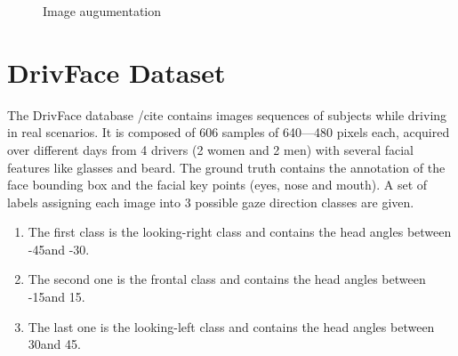 \documentclass[a4paper, 12pt, oneside, BCOR1cm,toc=chapterentrywithdots]{scrbook}
\begin{document}
\begin{figure}[h]
\caption{Image augumentation}
\end{figure}

\section{DrivFace Dataset}

The DrivFace database /cite{} contains images sequences of subjects while driving in real scenarios. It is composed of 606 samples of 640—480 pixels each, acquired over different days from 4 drivers (2 women and 2 men) with several facial features like glasses and beard. The ground truth contains the annotation of the face bounding box and the facial key points (eyes, nose and mouth). A set of labels assigning each image into 3 possible gaze direction classes are given.

\begin{enumerate}
	\item The first class is the looking-right class and contains the head angles between -45\degree and -30\degree.
	\item The second one is the frontal class and contains the head angles between -15\degree and 15\degree.
	\item The last one is the looking-left class and contains the head angles between 30\degree and 45\degree.
\end{enumerate}
\end{document}

